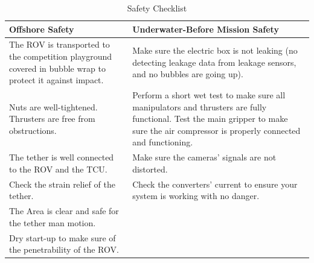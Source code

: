 \documentclass[a4paper,12pt,leqno]{report}
\begin{document}
\begin{table}[H]
	\centering
	\caption{Safety Checklist}
	\begin{tabular}{|p{8cm}|p{8cm}|}
		\hline
		\textcolor{red!80}{Offshore Safety}&\textcolor{red!80}{Underwater-Before Mission  Safety}\\ \hline
The ROV is transported to the  competition playground covered in  bubble wrap to protect it against  impact.  & Make sure the electric box is not  leaking (no detecting leakage data  from leakage sensors, and no  bubbles are going up). \\ \hline		
Nuts are well-tightened. Thrusters  are free from obstructions. & Perform a short wet test to make  sure all manipulators and thrusters  are fully functional. Test the main  gripper to make sure the air  compressor is properly connected  and functioning. \\ \hline
The tether is well connected to the ROV and the TCU. & Make sure the cameras’ signals are not distorted.\\ \hline
Check the strain relief of the tether.  & Check the converters’ current to ensure your system is working with  no danger. \\ \hline
The Area is clear and safe for the tether man motion. & \\ \hline
Dry start-up to make sure of the penetrability of the ROV. & \\ \hline
	\end{tabular}
\end{table}
\end{document}
